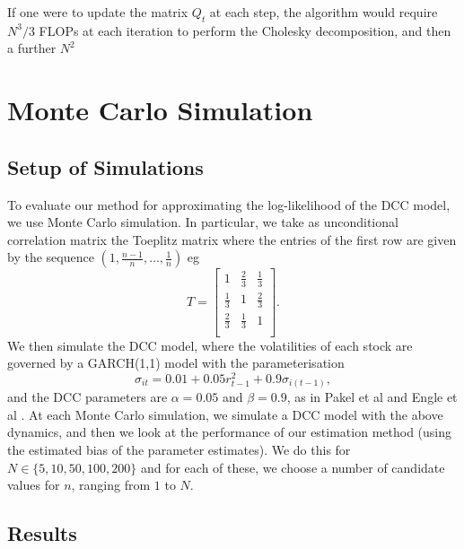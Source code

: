 \documentclass{article} %
\numberwithin{equation}{section} %
\numberwithin{figure}{section} %
\numberwithin{table}{section} %
\begin{document}
If one were to update the matrix $Q_t$ at each step, the algorithm would require $N^3/3$ FLOPs at each iteration to perform the Cholesky decomposition, and then a further $N^2$


\section{Monte Carlo Simulation}

\subsection{Setup of Simulations}

To evaluate our method for approximating the log-likelihood of the DCC model, we use Monte Carlo simulation. In particular, we take as unconditional correlation matrix the Toeplitz matrix where the entries of the first row are given by the sequence $(1, \frac{n-1}{n}, \ldots, \frac{1}{n})$ eg
\begin{equation}
  T=
    \begin{bmatrix}
      1 & \frac{2}{3}     &  \frac{1}{3}       \\
      \frac{1}{3} & 1 &  \frac{2}{3}        \\
       \frac{2}{3}  & \frac{1}{3} & 1  \\
    \end{bmatrix}.
\end{equation}
We then simulate the DCC model, where the volatilities of each stock are governed by a GARCH(1,1) model with the parameterisation
\begin{equation}
\sigma_{it} = 0.01 + 0.05 r_{t-1}^2 + 0.9\sigma_{i(t-1)},
\end{equation}
and the DCC parameters are $\alpha = 0.05$ and $\beta = 0.9$, as in Pakel et al \cite{pakel et al} and Engle et al \cite{engle et al}. At each Monte Carlo simulation, we simulate a DCC model with the above dynamics, and then we look at the performance of our estimation method (using the estimated bias of the parameter estimates). We do this for $N \in \{ 5,10,50,100,200\}$ and for each of these, we choose a number of candidate values for $n$, ranging from $1$ to $N$.

\subsection{Results}
\end{document}
